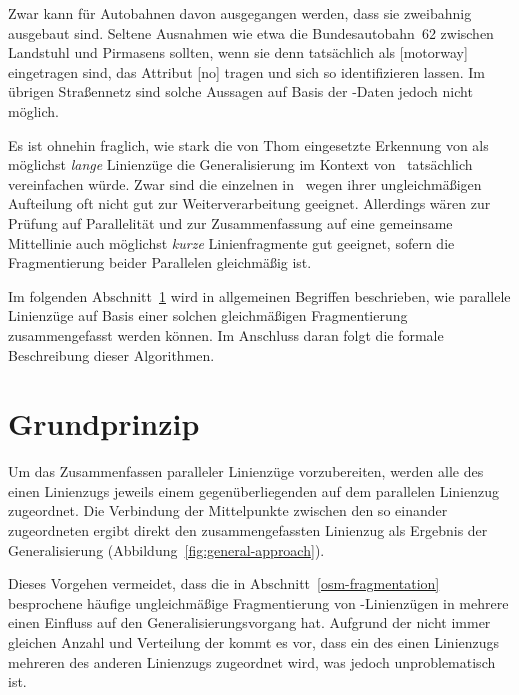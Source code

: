 \documentclass[../main/thesis.tex]{subfiles}
\begin{document}
Zwar kann für Autobahnen davon ausgegangen werden, dass sie zweibahnig ausgebaut sind.
Seltene Ausnahmen wie etwa die Bundesautobahn~62 zwischen Landstuhl und Pirmasens sollten, wenn sie denn tatsächlich als [motorway] eingetragen sind, das Attribut [no] tragen und sich so identifizieren lassen.
Im übrigen Straßennetz sind solche Aussagen auf Basis der \osm-Daten jedoch nicht möglich.

Es ist ohnehin fraglich, wie stark die von Thom eingesetzte Erkennung von  als möglichst \emph{lange} Linienzüge die Generalisierung im Kontext von \osm\ tatsächlich vereinfachen würde.
Zwar sind die einzelnen  in \osm\ wegen ihrer ungleichmäßigen Aufteilung oft nicht gut zur Weiterverarbeitung geeignet.
Allerdings wären zur Prüfung auf Parallelität und zur Zusammenfassung auf eine gemeinsame Mittellinie auch möglichst \emph{kurze} Linienfragmente gut geeignet, sofern die Fragmentierung beider Parallelen gleichmäßig ist.

Im folgenden Abschnitt~\ref{ch:algorithm-principle} wird in allgemeinen Begriffen beschrieben, wie parallele Linienzüge auf Basis einer solchen gleichmäßigen Fragmentierung zusammengefasst werden können.
Im Anschluss daran folgt die formale Beschreibung dieser Algorithmen.




\section{Grundprinzip}
\label{ch:algorithm-principle}

Um das Zusammenfassen paralleler Linienzüge vorzubereiten, werden alle  des einen Linienzugs jeweils einem gegenüberliegenden  auf dem parallelen Linienzug zugeordnet.
Die Verbindung der Mittelpunkte zwischen den so einander zugeordneten  ergibt direkt den zusammengefassten Linienzug als Ergebnis der Generalisierung (Abbildung~\ref{fig:general-approach}).

Dieses Vorgehen vermeidet, dass die in Abschnitt~\ref{osm-fragmentation} besprochene häufige ungleichmäßige Fragmentierung von \osm-Linienzügen in mehrere  einen Einfluss auf den Generalisierungsvorgang hat.
Aufgrund der nicht immer gleichen Anzahl und Verteilung der  kommt es vor, dass ein  des einen Linienzugs mehreren  des anderen Linienzugs zugeordnet wird, was jedoch unproblematisch ist.
\end{document}
